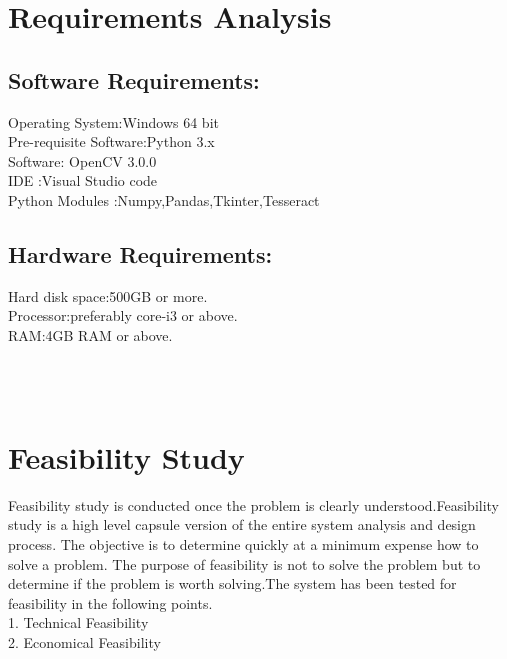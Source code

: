 \documentclass[12pt,a4paper]{report}
\begin{document}
\section{Requirements Analysis}
\subsection{Software Requirements:}
\begin{center}
\begin{description}

Operating System\hspace{0.6in}:Windows 64 bit\\
Pre-requisite Software\hspace{0.27in}:Python 3.x\\
Software\hspace{1.40in}: OpenCV 3.0.0\\
IDE \hspace{1.75in}:Visual Studio code\\
Python Modules \hspace{0.6in} :Numpy,Pandas,Tkinter,Tesseract\\
\end{description}
\end{center}
\subsection{Hardware Requirements:}
\begin{center}
    \begin{description}
        Hard disk space\hspace{0.4in}:500GB or more.\\
        Processor\hspace{0.99in}:preferably core-i3 or above.\\
        RAM\hspace{1.3in}:4GB RAM or above.
 \end{description}
\end{center}\\\\
\section{Feasibility Study}
Feasibility study is conducted once the problem is clearly understood.Feasibility study is a high level capsule version of the entire system analysis and design process.  The objective is to determine quickly at a minimum expense how to solve a problem. The purpose of feasibility is not to solve the problem but to determine if the problem is worth solving.The system has been tested for feasibility in the following points.\\
1. Technical Feasibility\\
2. Economical Feasibility\\
\end{document}
